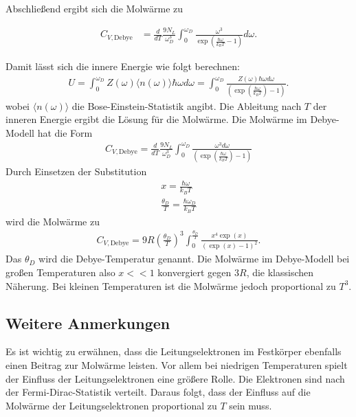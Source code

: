 Abschließend ergibt sich die Molwärme zu 

\begin{align}
    C_{V, \text{Debye}} &= \frac{d}{d T} \frac{9 N_L}{\omega_D^3} \int_0^{\omega_D} \frac{\omega^3}{\exp \left(\frac{\hbar \omega}{k_B T} -1 \right)} d \omega.
\end{align}

Damit lässt sich die innere Energie wie folgt berechnen:
\begin{align}
    U =  \int_0^{\omega_D} Z(\omega) \langle n(\omega)\rangle \hbar \omega d \omega=  \int_0^{\omega_D} \frac{Z(\omega) \hbar \omega d \omega}{\left(\exp \left(\frac{\hbar \omega}{k_B T}\right) -1 \right)}.
\end{align}
wobei $\langle n(\omega)\rangle$ die Bose-Einstein-Statistik angibt. Die Ableitung nach $T$ der inneren Energie ergibt die Lösung für die Molwärme. Die Molwärme im Debye-Modell hat die Form
\begin{align*}
    C_{V,\text{Debye}}= \frac{d}{d T}\frac{9 N_L}{\omega_D^3} \int_0^{\omega_D} \frac{\omega^3 d\omega}{\left(\exp \left(\frac{\hbar \omega}{k_B T}\right) -1 \right)}
\end{align*}
Durch Einsetzen der Substitution 
\begin{align}
    \label{eqn:debyesubst}
    x = \frac{\hbar \omega}{k_B T} \\  \frac{\theta_D}{T} = \frac{\hbar \omega_D}{ k_B T}
\end{align}
wird die Molwärme zu
\begin{align}
    C_{V,\text{Debye}} = 9 R \left(\frac{\theta_D}{T}\right)^3 \int_0^{\frac{\theta_D}{T}} \frac{x^4 \exp \left(x\right)}{ \left(\exp(x) -1\right)^2}.
\end{align}
Das $\theta_D$ wird die Debye-Temperatur genannt. Die Molwärme im Debye-Modell bei großen Temperaturen also $x<<1$ konvergiert gegen $3 R$, die klassischen Näherung. Bei kleinen Temperaturen ist die Molwärme 
jedoch proportional zu $T^3$. 
\subsection{Weitere Anmerkungen}
Es ist wichtig zu erwähnen, dass die Leitungselektronen im Festkörper ebenfalls einen Beitrag zur Molwärme leisten. Vor allem bei niedrigen Temperaturen spielt der Einfluss der Leitungselektronen eine größere Rolle. 
Die Elektronen sind nach der Fermi-Dirac-Statistik verteilt. Daraus folgt, dass der Einfluss auf die Molwärme der Leitungselektronen proportional zu $T$ sein muss. \\